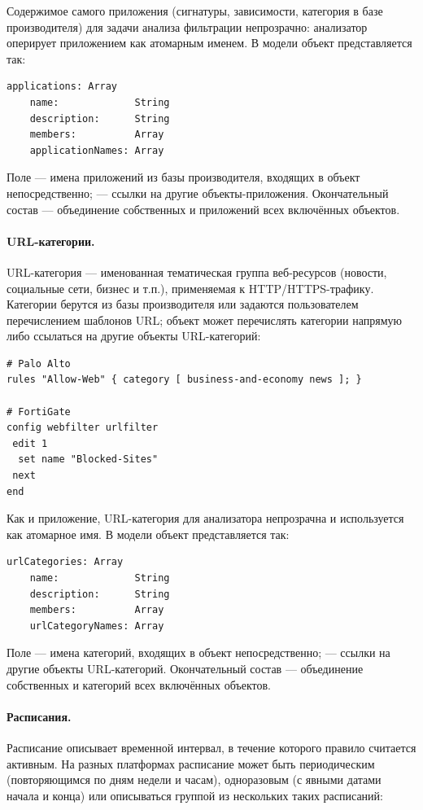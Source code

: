 Содержимое самого приложения (сигнатуры, зависимости, категория в базе производителя) для задачи анализа фильтрации непрозрачно: анализатор оперирует приложением как атомарным именем. В модели объект представляется так:

\begin{lstlisting}[style=schemastyle]
applications: Array
    name:             String
    description:      String
    members:          Array
    applicationNames: Array
\end{lstlisting}

Поле  --- имена приложений из базы производителя, входящих в объект непосредственно;  --- ссылки на другие объекты-приложения. Окончательный состав --- объединение собственных  и приложений всех включённых объектов.

\paragraph{URL-категории.} URL-категория --- именованная тематическая группа веб-ресурсов (новости, социальные сети, бизнес и т.п.), применяемая к HTTP/HTTPS-трафику. Категории берутся из базы производителя или задаются пользователем перечислением шаблонов URL; объект может перечислять категории напрямую либо ссылаться на другие объекты URL-категорий:

\begin{verbatim}
# Palo Alto
rules "Allow-Web" { category [ business-and-economy news ]; }

# FortiGate
config webfilter urlfilter
 edit 1
  set name "Blocked-Sites"
 next
end
\end{verbatim}

Как и приложение, URL-категория для анализатора непрозрачна и используется как атомарное имя. В модели объект представляется так:

\begin{lstlisting}[style=schemastyle]
urlCategories: Array
    name:             String
    description:      String
    members:          Array
    urlCategoryNames: Array
\end{lstlisting}

Поле  --- имена категорий, входящих в объект непосредственно;  --- ссылки на другие объекты URL-категорий. Окончательный состав --- объединение собственных  и категорий всех включённых объектов.

\paragraph{Расписания.} Расписание описывает временной интервал, в течение которого правило считается активным. На разных платформах расписание может быть периодическим (повторяющимся по дням недели и часам), одноразовым (с явными датами начала и конца) или описываться группой из нескольких таких расписаний:


